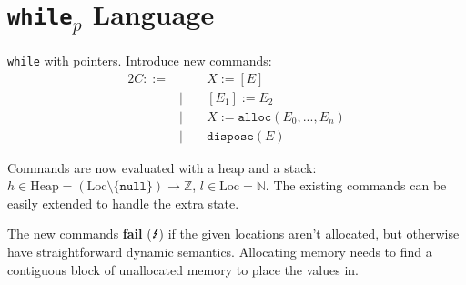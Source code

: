 \documentclass[a4paper, 11pt]{article}
\newcommand{\lightning}{\text{\Lightning}}
\begin{document}
\section*{\texttt{while}\(_p\) Language}
{
    \texttt{while} with pointers. Introduce new commands:
    \begin{alignat*}{2}
    C ::=& \; &\;&X := [E] \\
         & | && [E_1] := E_2 \\
         & | && X := \texttt{alloc}(E_0,...,E_n) \\
         & | && \texttt{dispose}(E)
    \end{alignat*}

    Commands are now evaluated with a heap and a stack: \(h\in\text{Heap} = (\text{Loc} \setminus \{\texttt{null}\}) \rightarrow \mathbb{Z}\), \(l\in\text{Loc} = \mathbb{N}\). The existing commands can be easily extended to handle the extra state.

    The new commands \textbf{fail} (\(\lightning\)) if the given locations aren't allocated, but otherwise have straightforward dynamic semantics. Allocating memory needs to find a contiguous block of unallocated memory to place the values in.

}
\end{document}
